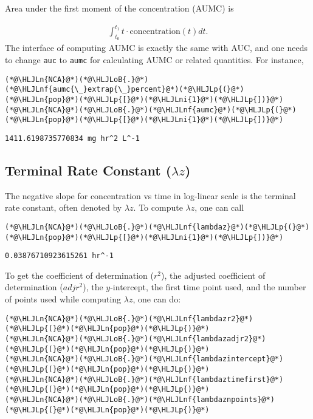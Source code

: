 \documentclass[12pt,a4paper]{article}
\newcommand{\HLJLn}[1]{#1}
\newcommand{\HLJLnf}[1]{\textcolor[RGB]{66,102,213}{#1}}
\newcommand{\HLJLni}[1]{\textcolor[RGB]{59,151,46}{#1}}
\newcommand{\HLJLoB}[1]{\textcolor[RGB]{102,102,102}{\textbf{#1}}}
\newcommand{\HLJLp}[1]{#1}
\begin{document}
Area under the first moment of the concentration (AUMC) is


\begin{align}
\int_{t_0}^{t_1} t\cdot\text{concentration}(t) dt.
\end{align}
The interface of computing AUMC is exactly the same with AUC, and one needs to change \texttt{auc} to \texttt{aumc} for calculating AUMC or related quantities. For instance,


\begin{lstlisting}
(*@\HLJLn{NCA}@*)(*@\HLJLoB{.}@*)(*@\HLJLnf{aumc{\_}extrap{\_}percent}@*)(*@\HLJLp{(}@*)(*@\HLJLn{pop}@*)(*@\HLJLp{[}@*)(*@\HLJLni{1}@*)(*@\HLJLp{])}@*)
(*@\HLJLn{NCA}@*)(*@\HLJLoB{.}@*)(*@\HLJLnf{aumc}@*)(*@\HLJLp{(}@*)(*@\HLJLn{pop}@*)(*@\HLJLp{[}@*)(*@\HLJLni{1}@*)(*@\HLJLp{])}@*)
\end{lstlisting}

\begin{lstlisting}
1411.6198735770834 mg hr^2 L^-1
\end{lstlisting}


\subsection{Terminal Rate Constant ($\lambda z$)}
The negative slope for concentration vs time in log-linear scale is the terminal rate constant, often denoted by $\lambda z$. To compute $\lambda z$, one can call


\begin{lstlisting}
(*@\HLJLn{NCA}@*)(*@\HLJLoB{.}@*)(*@\HLJLnf{lambdaz}@*)(*@\HLJLp{(}@*)(*@\HLJLn{pop}@*)(*@\HLJLp{[}@*)(*@\HLJLni{1}@*)(*@\HLJLp{])}@*)
\end{lstlisting}

\begin{lstlisting}
0.03876710923615261 hr^-1
\end{lstlisting}


To get the coefficient of determination ($r^2$), the adjusted coefficient of determination ($adjr^2$), the $y$-intercept, the first time point used, and the number of points used while computing $\lambda z$, one can do:


\begin{lstlisting}
(*@\HLJLn{NCA}@*)(*@\HLJLoB{.}@*)(*@\HLJLnf{lambdazr2}@*)(*@\HLJLp{(}@*)(*@\HLJLn{pop}@*)(*@\HLJLp{)}@*)
(*@\HLJLn{NCA}@*)(*@\HLJLoB{.}@*)(*@\HLJLnf{lambdazadjr2}@*)(*@\HLJLp{(}@*)(*@\HLJLn{pop}@*)(*@\HLJLp{)}@*)
(*@\HLJLn{NCA}@*)(*@\HLJLoB{.}@*)(*@\HLJLnf{lambdazintercept}@*)(*@\HLJLp{(}@*)(*@\HLJLn{pop}@*)(*@\HLJLp{)}@*)
(*@\HLJLn{NCA}@*)(*@\HLJLoB{.}@*)(*@\HLJLnf{lambdaztimefirst}@*)(*@\HLJLp{(}@*)(*@\HLJLn{pop}@*)(*@\HLJLp{)}@*)
(*@\HLJLn{NCA}@*)(*@\HLJLoB{.}@*)(*@\HLJLnf{lambdaznpoints}@*)(*@\HLJLp{(}@*)(*@\HLJLn{pop}@*)(*@\HLJLp{)}@*)
\end{lstlisting}
\end{document}
